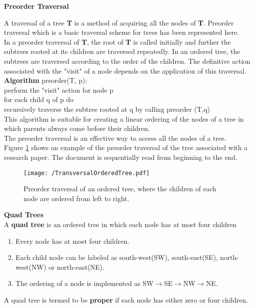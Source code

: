 		
		\textbf{Preorder Traversal}
		
		A traversal of a tree \textbf{T} is a method of acquiring all the nodes of \textbf{T}. Preorder traversal which is a basic traversal scheme for trees has been represented here.\\
		In a preorder traversal of \textbf{T}, the root of \textbf{T} is called initially and further the subtrees rooted at its children are traversed repeatedly. In an ordered tree, the subtrees are traversed according to the order of the children. The definitive action associated with the "visit" of a node depends on the application of this traversal.\\
		
		\textbf{Algorithm}  preorder(T, p):\\
		perform the "visit" action for node p\\
		for each child q of p do\\
		recursively traverse the subtree rooted at q by calling preorder (T,q)\\ 
		
		This algorithm is suitable for creating a linear ordering of the nodes of a tree in which parents always come before their children.\\
		
		The preorder traversal is an effective way to access all the nodes of a tree.\\
		
		Figure \ref{fig:TransversalOrderedTree} shows an example of the preorder traversal of the tree associated with a research paper. The document is sequentially read from beginning to the end.
		
				\begin{figure}[h]
				\centering
					\texttt{[image: /TransversalOrderedTree.pdf]}
					\caption{Preorder traversal of an ordered tree, where the children of each node are ordered from left to right.}
					\label{fig:TransversalOrderedTree}
				\end{figure}
		
		\textbf{Quad Trees}\\
		
		A \textbf{quad tree} is an ordered tree in which each node has at most four children
		\begin{enumerate}
			\item Every node has at most four children.
			\item Each child node can be labeled as south-west(SW), south-east(SE), north-west(NW) or north-east(NE).
			\item The ordering of a node is implemented as SW$\rightarrow$SE$\rightarrow$NW$\rightarrow$NE. 
		\end{enumerate}
		A quad tree is termed to be \textbf{proper} if each node has either zero or four children.\\
		
